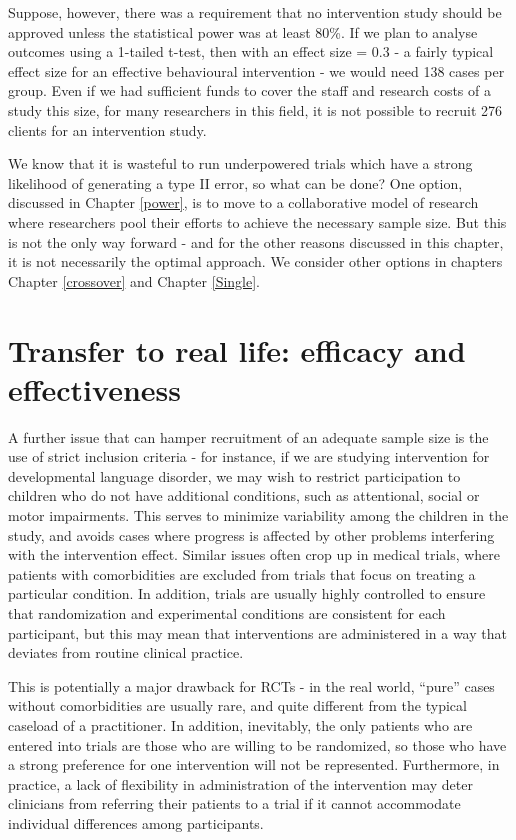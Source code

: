 \documentclass{krantz}
\begin{document}
Suppose, however, there was a requirement that no intervention study should be approved unless the statistical power was at least 80\%. If we plan to analyse outcomes using a 1-tailed t-test, then with an effect size = 0.3 - a fairly typical effect size for an effective behavioural intervention - we would need 138 cases per group. Even if we had sufficient funds to cover the staff and research costs of a study this size, for many researchers in this field, it is not possible to recruit 276 clients for an intervention study.

We know that it is wasteful to run underpowered trials which have a strong likelihood of generating a type II error, so what can be done? One option, discussed in Chapter \ref{power}, is to move to a collaborative model of research where researchers pool their efforts to achieve the necessary sample size. But this is not the only way forward - and for the other reasons discussed in this chapter, it is not necessarily the optimal approach. We consider other options in chapters Chapter \ref{crossover} and Chapter \ref{Single}.

\hypertarget{transfer-to-real-life-efficacy-and-effectiveness}{%
\section{Transfer to real life: efficacy and effectiveness}\label{transfer-to-real-life-efficacy-and-effectiveness}}

A further issue that can hamper recruitment of an adequate sample size is the use of strict inclusion criteria - for instance, if we are studying intervention for developmental language disorder, we may wish to restrict participation to children who do not have additional conditions, such as attentional, social or motor impairments. This serves to minimize variability among the children in the study, and avoids cases where progress is affected by other problems interfering with the intervention effect. Similar issues often crop up in medical trials, where patients with comorbidities are excluded from trials that focus on treating a particular condition. In addition, trials are usually highly controlled to ensure that randomization and experimental conditions are consistent for each participant, but this may mean that interventions are administered in a way that deviates from routine clinical practice.

This is potentially a major drawback for RCTs - in the real world, ``pure'' cases without comorbidities are usually rare, and quite different from the typical caseload of a practitioner. In addition, inevitably, the only patients who are entered into trials are those who are willing to be randomized, so those who have a strong preference for one intervention will not be represented. Furthermore, in practice, a lack of flexibility in administration of the intervention may deter clinicians from referring their patients to a trial if it cannot accommodate individual differences among participants.
\end{document}
